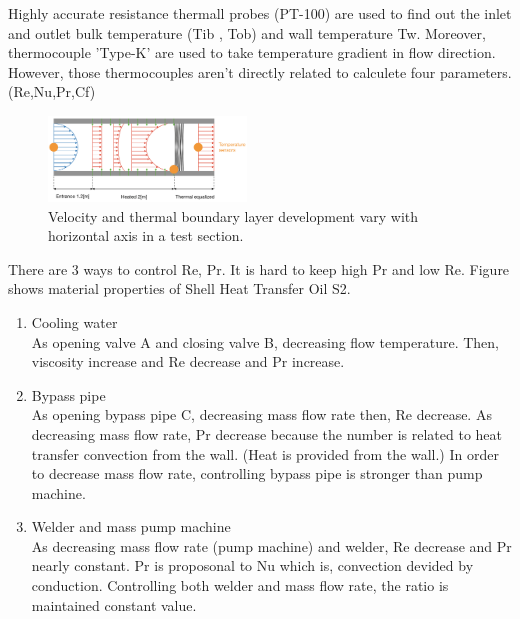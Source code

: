 \documentclass[conference]{IEEEtran}
\begin{document}
Highly accurate resistance thermall probes (PT-100) are used to find out the inlet and outlet bulk temperature (Tib , Tob) and wall temperature Tw.
Moreover, thermocouple 'Type-K' are used to take temperature gradient in flow direction.
However, those thermocouples aren't directly related to calculete four parameters.(Re,Nu,Pr,Cf)
\begin{figure}[htbp]
  \centering
\includegraphics[width=0.47\textwidth,natwidth=800,natheight=300]{fig/thermal_boundary_layer_development.png}
  \caption{Velocity and thermal boundary layer development vary with horizontal axis in a test section.}
  \label{thermal_boundary_layer_development}
\end{figure}

There are 3 ways to control Re, Pr.
It is hard to keep high Pr and low Re.
Figure\label{density_rho} shows material properties of Shell Heat Transfer Oil S2.

\begin{enumerate}
  \item Cooling water\\
  As opening valve A and closing valve B, decreasing flow temperature.
  Then, viscosity increase and Re decrease and Pr increase.
  \item Bypass pipe\\
  As opening bypass pipe C, decreasing mass flow rate then, Re decrease.
  As decreasing mass flow rate, Pr decrease because the number is related to heat transfer convection from the wall. (Heat is provided from the wall.)
  In order to decrease mass flow rate, controlling bypass pipe is stronger than pump machine.
  \item Welder and mass pump machine\\
  As decreasing mass flow rate (pump machine) and welder, Re decrease and Pr nearly constant.
  Pr is proposonal to Nu which is, convection devided by conduction.
  Controlling both welder and mass flow rate, the ratio is maintained constant value.
\end{enumerate}
\end{document}
